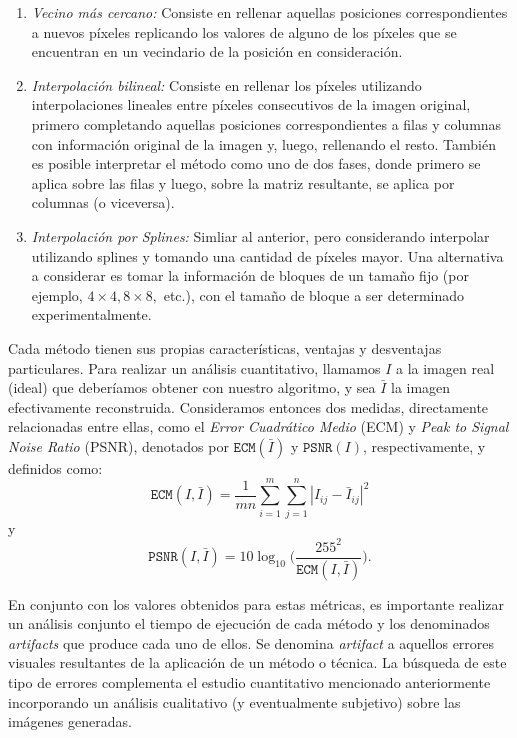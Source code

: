 \documentclass[a4paper]{article}
\newcounter{col}
\begin{document}
\begin{enumerate}
\item \emph{Vecino m\'as cercano:} Consiste en rellenar aquellas posiciones correspondientes a nuevos p\'ixeles replicando los valores de alguno de los p\'ixeles que se encuentran en un vecindario de la posici\'on en consideraci\'on. \label{item:nn}
\item \emph{Interpolaci\'on bilineal:} Consiste en rellenar los p\'ixeles utilizando interpolaciones lineales entre p\'ixeles consecutivos de la imagen original, primero completando aquellas posiciones correspondientes a filas y columnas con informaci\'on original de la imagen y, luego, rellenando el resto. Tambi\'en es posible interpretar el m\'etodo como uno de dos fases, donde primero se aplica sobre las filas y luego, sobre la matriz resultante, se aplica por columnas (o viceversa). \label{item:bilineal}
\item \emph{Interpolaci\'on por Splines:} Simliar al anterior, pero considerando interpolar utilizando splines y tomando una cantidad de p\'ixeles mayor. Una alternativa a considerar es tomar la informaci\'on de bloques de un tama\~no fijo (por ejemplo, $4\times 4, 8\times 8,$ etc.), con el tama\~no de bloque a ser determinado experimentalmente. \label{item:spline}
\end{enumerate}

\newpage

Cada m\'etodo tienen sus propias caracter\'isticas, ventajas y desventajas particulares. Para realizar un an\'alisis cuantitativo, llamamos $I$ a la imagen real (ideal) que deber\'iamos obtener con nuestro algoritmo, y sea $\bar{I}$ la imagen efectivamente reconstruida. Consideramos entonces dos medidas, directamente relacionadas entre ellas, como el \emph{Error Cuadr\'atico Medio} (ECM) y \emph{Peak to Signal Noise Ratio} (PSNR), denotados por $\texttt{ECM}(\bar{I})$ y $\texttt{PSNR}(I)$, respectivamente, y definidos como:
\begin{equation}
\texttt{ECM}(I,\bar{I}) = \frac{1}{mn}\sum_{i=1}^m\sum_{j = 1}^n |I_{ij} - \bar{I}_{ij}|^2 \label{eq:ecm}
\end{equation}
\noindent y
\begin{equation}
\texttt{PSNR}(I,\bar{I}) = 10 \log_{10}\bigg(\frac{255^2}{\texttt{ECM}(I,\bar{I})}\bigg). \label{eq:psnr}
\end{equation}

En conjunto con los valores obtenidos para estas m\'etricas, es importante realizar un an\'alisis conjunto el tiempo de ejecuci\'on de cada m\'etodo y los denominados \emph{artifacts} que produce cada uno de ellos. Se denomina \emph{artifact} a aquellos errores visuales resultantes de la aplicaci\'on de un m\'etodo o t\'ecnica. La b\'usqueda de este tipo de errores complementa el estudio cuantitativo mencionado anteriormente incorporando un an\'alisis cualitativo (y eventualmente subjetivo) sobre las im\'agenes generadas.
\end{document}
